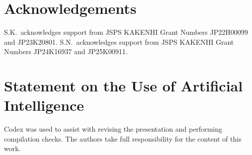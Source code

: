 \documentclass[11pt]{article}
\numberwithin{equation}{section}
\newcommand{\1}{\mathbf 1}
\begin{document}
\section*{Acknowledgements}

S.K.\ acknowledges support from JSPS KAKENHI Grant Numbers JP22H00099 and JP23K20801.
S.N.\ acknowledges support from JSPS KAKENHI Grant Numbers JP24K16937 and JP25K00911.

\section*{Statement on the Use of Artificial Intelligence}

Codex was used to assist with revising the presentation and performing compilation checks. The authors take full responsibility for the content of this work.
\end{document}
